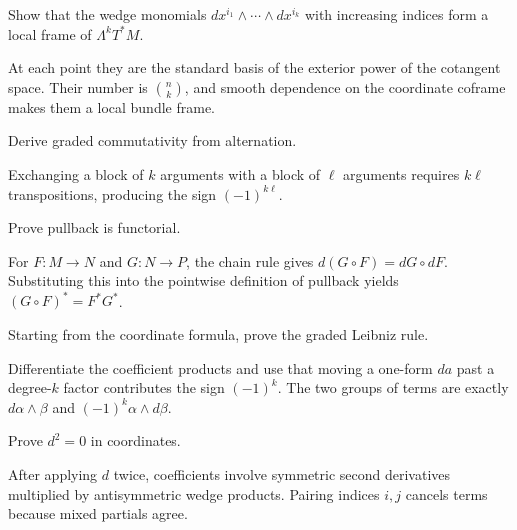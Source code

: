 \begin{problem}\label{prob:vii09-01}
Show that the wedge monomials \(dx^{i_1}\wedge\cdots\wedge dx^{i_k}\) with increasing indices form a local frame of \(\Lambda^kT^*M\).
\end{problem}
\begin{solution}
At each point they are the standard basis of the exterior power of the cotangent space. Their number is \(\binom nk\), and smooth dependence on the coordinate coframe makes them a local bundle frame.
\end{solution}

\begin{problem}\label{prob:vii09-02}
Derive graded commutativity from alternation.
\end{problem}
\begin{solution}
Exchanging a block of \(k\) arguments with a block of \(\ell\) arguments requires \(k\ell\) transpositions, producing the sign \((-1)^{k\ell}\).
\end{solution}

\begin{problem}\label{prob:vii09-03}
Prove pullback is functorial.
\end{problem}
\begin{solution}
For \(F:M\to N\) and \(G:N\to P\), the chain rule gives \(d(G\circ F)=dG\circ dF\). Substituting this into the pointwise definition of pullback yields \((G\circ F)^*=F^*G^*\).
\end{solution}

\begin{problem}\label{prob:vii09-04}
Starting from the coordinate formula, prove the graded Leibniz rule.
\end{problem}
\begin{solution}
Differentiate the coefficient products and use that moving a one-form \(da\) past a degree-\(k\) factor contributes the sign \((-1)^k\). The two groups of terms are exactly \(d\alpha\wedge\beta\) and \((-1)^k\alpha\wedge d\beta\).
\end{solution}

\begin{problem}[\(d^2=0\) problem]\label{prob:vii09-05}
Prove \(d^2=0\) in coordinates.
\end{problem}
\begin{solution}
After applying \(d\) twice, coefficients involve symmetric second derivatives multiplied by antisymmetric wedge products. Pairing indices \(i,j\) cancels terms because mixed partials agree.
\end{solution}

